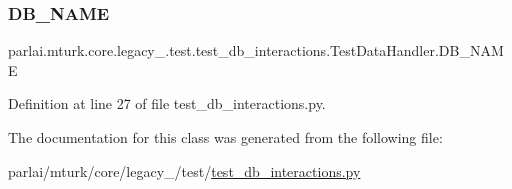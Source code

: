 \subsubsection{\texorpdfstring{D\+B\+\_\+\+N\+A\+ME}{DB\_NAME}}
{\footnotesize\ttfamily parlai.\+mturk.\+core.\+legacy\+\_.\+test.\+test\+\_\+db\+\_\+interactions.\+Test\+Data\+Handler.\+D\+B\+\_\+\+N\+A\+ME\hspace{0.3cm}{\ttfamily [static]}}



Definition at line 27 of file test\+\_\+db\+\_\+interactions.\+py.



The documentation for this class was generated from the following file\+:\begin{DoxyCompactItemize}
\item 
parlai/mturk/core/legacy\+\_/test/\hyperlink{legacy__2018_2test_2test__db__interactions_8py}{test\+\_\+db\+\_\+interactions.\+py}\end{DoxyCompactItemize}

